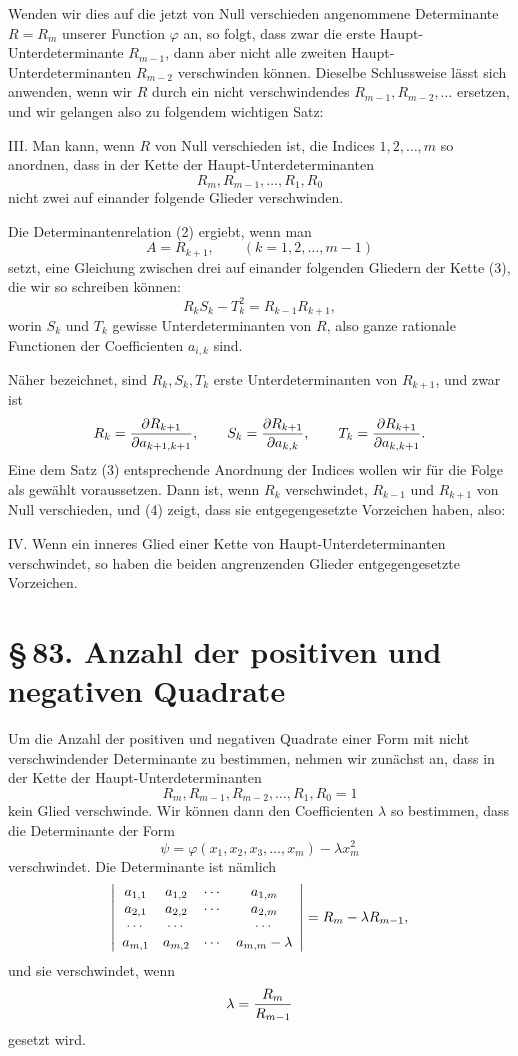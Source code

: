 \documentclass[11pt]{article}
\providecommand{\sect}[2]{\section*{\S\,#1. #2}}
\begin{document}
Wenden wir dies auf die jetzt von Null verschieden angenommene Determinante $R=R_m$ unserer Function $\varphi$ an, so folgt, dass zwar die erste Haupt-Unterdeterminante $R_{m-1}$, dann aber nicht alle zweiten Haupt-Unterdeterminanten $R_{m-2}$ verschwinden k\"onnen. Dieselbe Schlussweise l\"asst sich anwenden, wenn wir $R$ durch ein nicht verschwindendes $R_{m-1},R_{m-2},\ldots$ ersetzen, und wir gelangen also zu folgendem wichtigen Satz:

III. Man kann, wenn $R$ von Null verschieden ist, die Indices $1,2,
\ldots,m$ so anordnen, dass in der Kette der Haupt-Unterdeterminanten
\begin{equation}
        R_m, R_{m-1},\ldots,R_1,R_0
\tag{3}
\end{equation}
nicht zwei auf einander folgende Glieder verschwinden.

Die Determinantenrelation (2) ergiebt, wenn man
\[
        A=R_{k+1},\qquad (k=1,2,
\ldots,m-1)
\]
setzt, eine Gleichung zwischen drei auf einander folgenden Gliedern der Kette (3), die wir so schreiben k\"onnen:
\begin{equation}
        R_kS_k-T_k^2=R_{k-1}R_{k+1},
\tag{4}
\end{equation}
worin $S_k$ und $T_k$ gewisse Unterdeterminanten von $R$, also ganze rationale Functionen der Coefficienten $a_{i,k}$ sind.

N\"aher bezeichnet, sind $R_k,S_k,T_k$ erste Unterdeterminanten von $R_{k+1}$, und zwar ist
\[
        R_k={\partial R_{k+1}\over \partial a_{k+1,k+1}},
        \qquad
        S_k={\partial R_{k+1}\over \partial a_{k,k}},
        \qquad
        T_k={\partial R_{k+1}\over \partial a_{k,k+1}}.
\]
Eine dem Satz (3) entsprechende Anordnung der Indices wollen wir f\"ur die Folge als gew\"ahlt voraussetzen. Dann ist, wenn $R_k$ verschwindet, $R_{k-1}$ und $R_{k+1}$ von Null verschieden, und (4) zeigt, dass sie entgegengesetzte Vorzeichen haben, also:

IV. Wenn ein inneres Glied einer Kette von Haupt-Unterdeterminanten verschwindet, so haben die beiden angrenzenden Glieder entgegengesetzte Vorzeichen.

\sect{83}{Anzahl der positiven und negativen Quadrate}

Um die Anzahl der positiven und negativen Quadrate einer Form mit nicht verschwindender Determinante zu bestimmen, nehmen wir zun\"achst an, dass in der Kette der Haupt-Unterdeterminanten
\[
        R_m,
        R_{m-1},
        R_{m-2},
        \ldots,
        R_1,
        R_0=1
\]
kein Glied verschwinde. Wir k\"onnen dann den Coefficienten $\lambda$ so bestimmen, dass die Determinante der Form
\begin{equation}
        \psi=\varphi(x_1,x_2,x_3,
\ldots,x_m)-\lambda x_m^2
\tag{1}
\end{equation}
verschwindet. Die Determinante ist n\"amlich
\[
\left|\begin{array}{cccc}
 a_{1,1}&a_{1,2}&\cdots&a_{1,m}\cr
 a_{2,1}&a_{2,2}&\cdots&a_{2,m}\cr
 \cdots&\cdots&&\cdots\cr
 a_{m,1}&a_{m,2}&\cdots&a_{m,m}-\lambda
\end{array}\right|
      =R_m-\lambda R_{m-1},
\]
und sie verschwindet, wenn
\[
        \lambda={R_m\over R_{m-1}}
\]
gesetzt wird.
\end{document}
